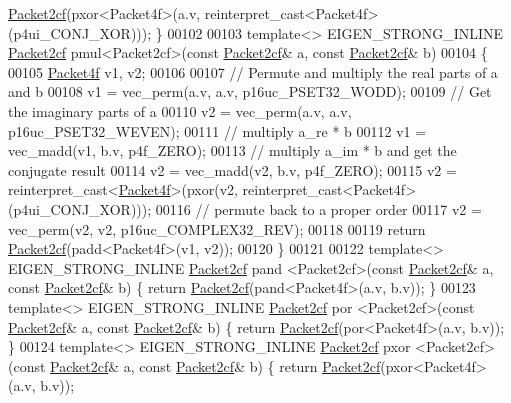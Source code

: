 \begin{DoxyCode}
      \hyperlink{struct_eigen_1_1internal_1_1_packet2cf}{Packet2cf}(pxor<Packet4f>(a.v, reinterpret\_cast<Packet4f>(p4ui\_CONJ\_XOR))); \}
00102 
00103 \textcolor{keyword}{template}<> EIGEN\_STRONG\_INLINE \hyperlink{struct_eigen_1_1internal_1_1_packet2cf}{Packet2cf} pmul<Packet2cf>(\textcolor{keyword}{const} 
      \hyperlink{struct_eigen_1_1internal_1_1_packet2cf}{Packet2cf}& a, \textcolor{keyword}{const} \hyperlink{struct_eigen_1_1internal_1_1_packet2cf}{Packet2cf}& b)
00104 \{
00105   \hyperlink{struct_eigen_1_1internal_1_1_packet4f}{Packet4f} v1, v2;
00106 
00107   \textcolor{comment}{// Permute and multiply the real parts of a and b}
00108   v1 = vec\_perm(a.v, a.v, p16uc\_PSET32\_WODD);
00109   \textcolor{comment}{// Get the imaginary parts of a}
00110   v2 = vec\_perm(a.v, a.v, p16uc\_PSET32\_WEVEN);
00111   \textcolor{comment}{// multiply a\_re * b }
00112   v1 = vec\_madd(v1, b.v, p4f\_ZERO);
00113   \textcolor{comment}{// multiply a\_im * b and get the conjugate result}
00114   v2 = vec\_madd(v2, b.v, p4f\_ZERO);
00115   v2 = \textcolor{keyword}{reinterpret\_cast<}\hyperlink{struct_eigen_1_1internal_1_1_packet4f}{Packet4f}\textcolor{keyword}{>}(pxor(v2, reinterpret\_cast<Packet4f>(p4ui\_CONJ\_XOR)));
00116   \textcolor{comment}{// permute back to a proper order}
00117   v2 = vec\_perm(v2, v2, p16uc\_COMPLEX32\_REV);
00118   
00119   \textcolor{keywordflow}{return} \hyperlink{struct_eigen_1_1internal_1_1_packet2cf}{Packet2cf}(padd<Packet4f>(v1, v2));
00120 \}
00121 
00122 \textcolor{keyword}{template}<> EIGEN\_STRONG\_INLINE \hyperlink{struct_eigen_1_1internal_1_1_packet2cf}{Packet2cf} pand   <Packet2cf>(\textcolor{keyword}{const} 
      \hyperlink{struct_eigen_1_1internal_1_1_packet2cf}{Packet2cf}& a, \textcolor{keyword}{const} \hyperlink{struct_eigen_1_1internal_1_1_packet2cf}{Packet2cf}& b) \{ \textcolor{keywordflow}{return} \hyperlink{struct_eigen_1_1internal_1_1_packet2cf}{Packet2cf}(pand<Packet4f>(a.v, b.v)); 
      \}
00123 \textcolor{keyword}{template}<> EIGEN\_STRONG\_INLINE \hyperlink{struct_eigen_1_1internal_1_1_packet2cf}{Packet2cf} por    <Packet2cf>(\textcolor{keyword}{const} 
      \hyperlink{struct_eigen_1_1internal_1_1_packet2cf}{Packet2cf}& a, \textcolor{keyword}{const} \hyperlink{struct_eigen_1_1internal_1_1_packet2cf}{Packet2cf}& b) \{ \textcolor{keywordflow}{return} \hyperlink{struct_eigen_1_1internal_1_1_packet2cf}{Packet2cf}(por<Packet4f>(a.v, b.v)); \}
00124 \textcolor{keyword}{template}<> EIGEN\_STRONG\_INLINE \hyperlink{struct_eigen_1_1internal_1_1_packet2cf}{Packet2cf} pxor   <Packet2cf>(\textcolor{keyword}{const} 
      \hyperlink{struct_eigen_1_1internal_1_1_packet2cf}{Packet2cf}& a, \textcolor{keyword}{const} \hyperlink{struct_eigen_1_1internal_1_1_packet2cf}{Packet2cf}& b) \{ \textcolor{keywordflow}{return} \hyperlink{struct_eigen_1_1internal_1_1_packet2cf}{Packet2cf}(pxor<Packet4f>(a.v, b.v)); 

\end{DoxyCode}
